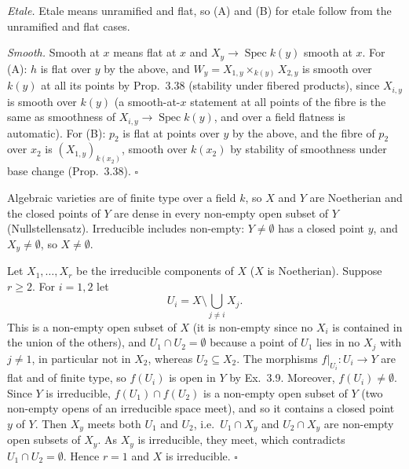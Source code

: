\documentclass[11pt]{article}
\begin{document}
\emph{Etale.} Etale means unramified and flat, so (A) and (B) for etale follow from the unramified and flat cases.

\emph{Smooth.} Smooth at $x$ means flat at $x$ and $X_y\to\operatorname{Spec}k(y)$ smooth at $x$. For (A): $h$ is flat over $y$ by the above, and $W_y=X_{1,y}\times_{k(y)}X_{2,y}$ is smooth over $k(y)$ at all its points by Prop.~3.38 (stability under fibered products), since $X_{i,y}$ is smooth over $k(y)$ (a smooth-at-$x$ statement at all points of the fibre is the same as smoothness of $X_{i,y}\to\operatorname{Spec}k(y)$, and over a field flatness is automatic). For (B): $p_2$ is flat at points over $y$ by the above, and the fibre of $p_2$ over $x_2$ is $(X_{1,y})_{k(x_2)}$, smooth over $k(x_2)$ by stability of smoothness under base change (Prop.~3.38). \hfill$\square$

\pf
Algebraic varieties are of finite type over a field $k$, so $X$ and $Y$ are Noetherian and the closed points of $Y$ are dense in every non-empty open subset of $Y$ (Nullstellensatz). Irreducible includes non-empty: $Y\ne\emptyset$ has a closed point $y$, and $X_y\neq\emptyset$, so $X\ne\emptyset$.

Let $X_1,\dots,X_r$ be the irreducible components of $X$ ($X$ is Noetherian). Suppose $r\ge2$. For $i=1,2$ let
\[ U_i=X\setminus\bigcup_{j\ne i}X_j . \]
This is a non-empty open subset of $X$ (it is non-empty since no $X_i$ is contained in the union of the others), and $U_1\cap U_2=\emptyset$ because a point of $U_1$ lies in no $X_j$ with $j\ne1$, in particular not in $X_2$, whereas $U_2\subseteq X_2$. The morphisms $f|_{U_i}:U_i\to Y$ are flat and of finite type, so $f(U_i)$ is open in $Y$ by Ex.~3.9. Moreover, $f(U_i)\neq\emptyset$. Since $Y$ is irreducible, $f(U_1)\cap f(U_2)$ is a non-empty open subset of $Y$ (two non-empty opens of an irreducible space meet), and so it contains a closed point $y$ of $Y$. Then $X_y$ meets both $U_1$ and $U_2$, i.e.\ $U_1\cap X_y$ and $U_2\cap X_y$ are non-empty open subsets of $X_y$. As $X_y$ is irreducible, they meet, which contradicts $U_1\cap U_2=\emptyset$. Hence $r=1$ and $X$ is irreducible. \hfill$\square$
\end{document}
